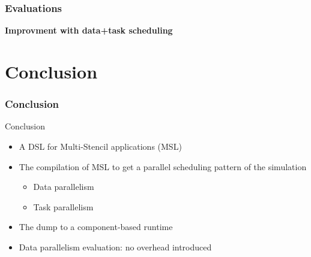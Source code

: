 \documentclass{beamer}
\begin{document}
\begin{frame}
\frametitle{Evaluations}
\textbf{Improvment with data+task scheduling}
\begin{center}
\end{center}
\end{frame}

\section{Conclusion}
\begin{frame}
\frametitle{Conclusion}
\begin{block}{Conclusion}
\begin{itemize}
\item A DSL for Multi-Stencil applications (MSL)
\item The compilation of MSL to get a parallel scheduling pattern of the simulation
\begin{itemize}
\item Data parallelism
\item Task parallelism
\end{itemize}
\item The dump to a component-based runtime
\item Data parallelism evaluation: no overhead introduced 
\end{itemize}
\end{block}
\end{frame}
\end{document}
